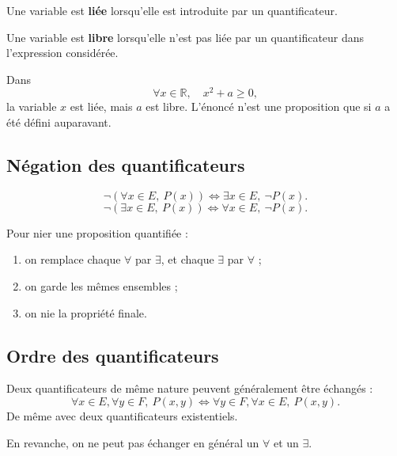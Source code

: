\documentclass[11pt,a4paper]{article}
\newcommand{\R}{\mathbb{R}}
\newcommand{\non}{\neg}
\newcommand{\ssi}{\Longleftrightarrow}
\begin{document}
\begin{definitionbox}
Une variable est \textbf{liée} lorsqu'elle est introduite par un quantificateur.
\end{definitionbox}

\begin{definitionbox}
Une variable est \textbf{libre} lorsqu'elle n'est pas liée par un quantificateur dans l'expression considérée.
\end{definitionbox}

\begin{exemplebox}
Dans
\[
\forall x\in\R,\quad x^2+a\geq0,
\]
la variable \(x\) est liée, mais \(a\) est libre. L'énoncé n'est une proposition que si \(a\) a été défini auparavant.
\end{exemplebox}

\subsection{Négation des quantificateurs}

\begin{propositionbox}
\[
\non\left(\forall x\in E,\ P(x)\right)
\ssi
\exists x\in E,\ \non P(x).
\]
\[
\non\left(\exists x\in E,\ P(x)\right)
\ssi
\forall x\in E,\ \non P(x).
\]
\end{propositionbox}

\begin{methodebox}
Pour nier une proposition quantifiée :
\begin{enumerate}
    \item on remplace chaque \(\forall\) par \(\exists\), et chaque \(\exists\) par \(\forall\) ;
    \item on garde les mêmes ensembles ;
    \item on nie la propriété finale.
\end{enumerate}
\end{methodebox}

\subsection{Ordre des quantificateurs}

\begin{propositionbox}
Deux quantificateurs de même nature peuvent généralement être échangés :
\[
\forall x\in E,\forall y\in F,\ P(x,y)
\ssi
\forall y\in F,\forall x\in E,\ P(x,y).
\]
De même avec deux quantificateurs existentiels.

En revanche, on ne peut pas échanger en général un \(\forall\) et un \(\exists\).
\end{propositionbox}
\end{document}
